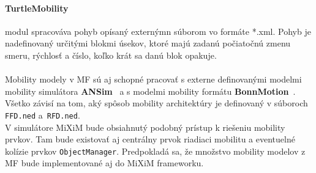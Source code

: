 \paragraph{TurtleMobility} modul spracováva pohyb opísaný externýmn súborom vo formáte *.xml. Pohyb je nadefinovaný určitými blokmi úsekov, ktoré majú zadanú počiatočnú zmenu smeru, rýchlosť a číslo, koľko krát sa danú blok opakuje.\\ \\
\indent Mobility modely v MF sú aj schopné pracovať s externe definovanými modelmi mobility simulátora \textbf{ANSim}~\cite{ansim_report} a s modelmi mobility formátu \textbf{BonnMotion}~\cite{bonnmotion_report}. Všetko závisí na tom, aký spôsob mobility architektúry je definovaný v súboroch \texttt{FFD.ned} a~\texttt{RFD.ned}.\\
\indent V simulátore MiXiM bude obsiahnutý podobný prístup k riešeniu mobility prvkov. Tam bude existovať aj centrálny prvok riadiaci mobilitu a eventuelné kolízie prvkov \texttt{ObjectManager}. Predpokladá sa, že množstvo mobility modelov z MF bude implementované aj do MiXiM frameworku.\\

